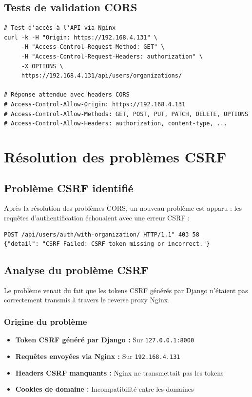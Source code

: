 \documentclass[12pt,a4paper]{article}
\begin{document}
\subsection{Tests de validation CORS}

\begin{lstlisting}[style=bash, caption={Tests de connectivité CORS}]
# Test d'accès à l'API via Nginx
curl -k -H "Origin: https://192.168.4.131" \
     -H "Access-Control-Request-Method: GET" \
     -H "Access-Control-Request-Headers: authorization" \
     -X OPTIONS \
     https://192.168.4.131/api/users/organizations/

# Réponse attendue avec headers CORS
# Access-Control-Allow-Origin: https://192.168.4.131
# Access-Control-Allow-Methods: GET, POST, PUT, PATCH, DELETE, OPTIONS
# Access-Control-Allow-Headers: authorization, content-type, ...
\end{lstlisting}


\section{Résolution des problèmes CSRF}

\subsection{Problème CSRF identifié}

Après la résolution des problèmes CORS, un nouveau problème est apparu : les requêtes d'authentification échouaient avec une erreur CSRF :

\begin{lstlisting}[style=bash, caption={Erreur CSRF dans l'API Django}]
POST /api/users/auth/with-organization/ HTTP/1.1" 403 58
{"detail": "CSRF Failed: CSRF token missing or incorrect."}
\end{lstlisting}

\subsection{Analyse du problème CSRF}

Le problème venait du fait que les tokens CSRF générés par Django n'étaient pas correctement transmis à travers le reverse proxy Nginx.

\subsubsection{Origine du problème}
\begin{itemize}[leftmargin=*]
    \item \textbf{Token CSRF généré par Django :} Sur \texttt{127.0.0.1:8000}
    \item \textbf{Requêtes envoyées via Nginx :} Sur \texttt{192.168.4.131}
    \item \textbf{Headers CSRF manquants :} Nginx ne transmettait pas les tokens
    \item \textbf{Cookies de domaine :} Incompatibilité entre les domaines
\end{itemize}
\end{document}
